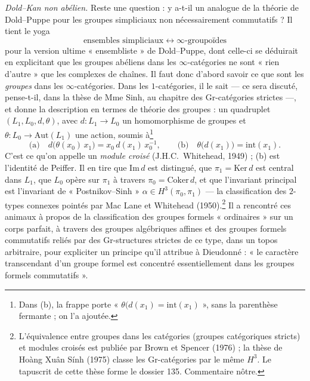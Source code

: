 \documentclass[11pt,a4paper]{article}
\begin{document}
\emph{Dold--Kan non abélien.} Reste une question : y a-t-il un analogue de
la théorie de Dold--Puppe pour les groupes simpliciaux non nécessairement
commutatifs ? Il tient le yoga
\[
\text{ensembles simpliciaux} \longleftrightarrow \infty\text{-groupoïdes}
\]
pour la version ultime « ensembliste » de Dold--Puppe, dont celle-ci se
déduirait en explicitant que les groupes abéliens dans les
$\infty$-catégories ne sont « rien d'autre » que les complexes de chaînes. Il
faut donc d'abord savoir ce que sont les \emph{groupes} dans les
$\infty$-catégories. Dans les $1$-catégories, il le sait --- ce sera
discuté, pense-t-il, dans la thèse de Mme Sinh, au chapitre des
Gr-catégories strictes ---, et donne la description en termes de théorie
des groupes : un quadruplet $(L_1,L_0,d,\theta)$, avec
$d : L_1 \to L_0$ un homomorphisme de groupes et
$\theta : L_0 \to \mathrm{Aut}(L_1)$ une action, soumis à\footnote{Dans (b), la frappe porte « $\theta(d(x_1) = \mathrm{int}(x_1)$ »,
sans la parenthèse fermante ; on l'a ajoutée.}
\[
\text{(a)}\quad d\bigl(\theta(x_0)\,x_1\bigr) = x_0\,d(x_1)\,x_0^{-1}, \qquad
\text{(b)}\quad \theta\bigl(d(x_1)\bigr) = \mathrm{int}(x_1).
\]
C'est ce qu'on appelle un \emph{module croisé} (J.H.C.~Whitehead, 1949) ; (b)
est l'identité de Peiffer. Il en tire que $\mathrm{Im}\,d$ est distingué, que
$\pi_1 = \mathrm{Ker}\,d$ est central dans $L_1$, que $L_0$ opère sur
$\pi_1$ à travers $\pi_0 = \mathrm{Coker}\,d$, et que l'invariant principal
est l'invariant de « Postnikov--Sinh » $\alpha \in H^3(\pi_0,\pi_1)$ ---
la classification des $2$-types connexes pointés par Mac Lane et Whitehead
(1950).\footnote{L'équivalence entre groupes dans les catégories (groupes
catégoriques stricts) et modules croisés est publiée par Brown et Spencer
(1976) ; la thèse de Hoàng Xuân Sính (1975) classe les Gr-catégories par le
même $H^3$. Le tapuscrit de cette thèse forme le dossier 135. Commentaire
nôtre.} Il a rencontré ces animaux à propos de la classification des groupes
formels « ordinaires » sur un corps parfait, à travers des groupes algébriques
affines et des groupes formels commutatifs reliés par des Gr-structures
strictes de ce type, dans un topos arbitraire, pour expliciter un principe
qu'il attribue à Dieudonné : « le caractère transcendant d'un groupe formel
est concentré essentiellement dans les groupes formels commutatifs ».
\end{document}
